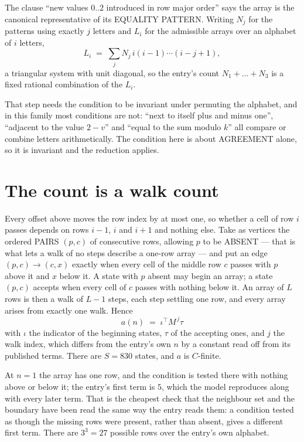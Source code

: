 \documentclass[11pt,a4paper]{article}
\theoremstyle{plain}
\theoremstyle{definition}
\begin{document}
The clause ``new values $0..2$ introduced in row major order'' says the array is the
canonical representative of its EQUALITY PATTERN. Writing $N_j$ for the patterns using exactly
$j$ letters and $L_i$ for the admissible arrays over an alphabet of $i$ letters,
\[
L_i\;=\;\sum_j N_j\,i(i-1)\cdots(i-j+1),
\]
a triangular system with unit diagonal, so the entry's count $N_1+\dots+N_{3}$ is a
fixed rational combination of the $L_i$.

That step needs the condition to be invariant under permuting the alphabet, and in this family
most conditions are not: ``next to itself plus and minus one'', ``adjacent to the value
$2-v$'' and ``equal to the sum modulo $k$'' all compare or combine letters arithmetically.
The condition here is about AGREEMENT alone, so it is invariant and the reduction applies.

\section{The count is a walk count}

Every offset above moves the row index by at most one, so whether a cell of row $i$ passes
depends on rows $i-1$, $i$ and $i+1$ and nothing else. Take as vertices the ordered PAIRS
$(p,c)$ of consecutive rows, allowing $p$ to be ABSENT --- that is what lets a walk of no steps
describe a one-row array --- and put an edge $(p,c)\to(c,x)$ exactly when every cell of the
middle row $c$ passes with $p$ above it and $x$ below it. A state with $p$ absent may begin an
array; a state $(p,c)$ accepts when every cell of $c$ passes with nothing below it. An array of
$L$ rows is then a walk of $L-1$ steps, each step settling one row, and every array arises from
exactly one walk. Hence
\[
a(n)\;=\;\iota^{\!\top}M^{\,j}\tau
\]
with $\iota$ the indicator of the beginning states, $\tau$ of the accepting ones, and $j$ the
walk index, which differs from the entry's own $n$ by a constant read off from its published
terms. There are $S=830$ states, and $a$ is $C$-finite.

At $n=1$ the array has one row, and
the condition is tested there with nothing above or below it; the entry's first term is
$5$, which the model reproduces along with every later term. That is the cheapest check
that the neighbour set and the boundary have been read the same way the entry reads them: a
condition tested as though the missing rows were present, rather than absent, gives a different
first term. There are $3^{3}=27$ possible rows over the entry's own alphabet.
\end{document}
